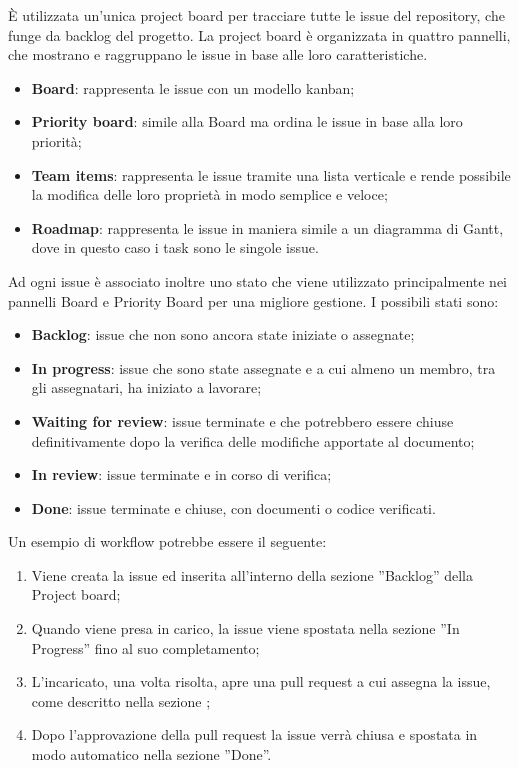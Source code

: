 \label{inf:pb}
È utilizzata un'unica project board per tracciare tutte le issue del repository, che funge da backlog del progetto. 
La project board è organizzata in quattro pannelli, che mostrano e raggruppano le issue in base alle loro caratteristiche.
\begin{itemize}
    \item \textbf{Board}: rappresenta le issue con un modello kanban;
    \item \textbf{Priority board}: simile alla Board ma ordina le issue in base alla loro priorità;
    \item \textbf{Team items}: rappresenta le issue tramite una lista verticale e rende possibile
          la modifica delle loro proprietà in modo semplice e veloce;
    \item \textbf{Roadmap}: rappresenta le issue in maniera simile a un diagramma di Gantt,
          dove in questo caso i task sono le singole issue.
\end{itemize}
Ad ogni issue è associato inoltre uno stato che viene utilizzato principalmente nei pannelli Board e Priority Board per una migliore gestione.
I possibili stati sono:
\begin{itemize}
    \item \textbf{Backlog}: issue che non sono ancora state iniziate o assegnate;
    \item \textbf{In progress}: issue che sono state assegnate e a cui almeno un membro, tra gli assegnatari, ha iniziato a lavorare;
    \item \textbf{Waiting for review}: issue terminate e che potrebbero essere chiuse definitivamente dopo la verifica delle modifiche apportate al documento;
    \item \textbf{In review}: issue terminate e in corso di verifica;
    \item \textbf{Done}: issue terminate e chiuse, con documenti o codice verificati.
\end{itemize}
Un esempio di workflow potrebbe essere il seguente:
\begin{enumerate}
    \item Viene creata la issue ed inserita all'interno della sezione ”Backlog” della
          Project board;
    \item Quando viene presa in carico, la issue viene spostata nella sezione ”In
          Progress” fino al suo completamento;
    \item L'incaricato, una volta risolta, apre una pull request a cui assegna la issue,
          come descritto nella sezione ;
    \item Dopo l'approvazione della pull request la issue verrà chiusa e spostata in modo
          automatico nella sezione ”Done”.
\end{enumerate}


